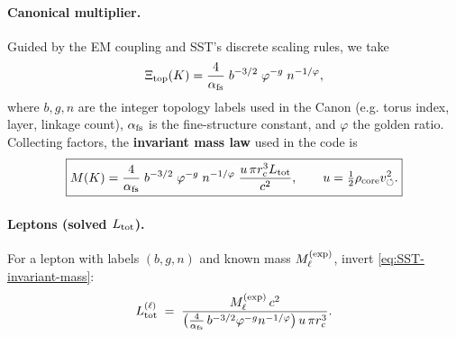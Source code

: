 \documentclass[11pt]{article}
\begin{document}
        \paragraph{Canonical multiplier.}
            Guided by the EM coupling and SST’s discrete scaling rules, we take
            \[
                \Xi_{\text{top}}(K)=\frac{4}{\alpha_{\rm fs}}\;b^{-3/2}\;\varphi^{-g}\;n^{-1/\varphi},
            \]
            where $b,g,n$ are the integer topology labels used in the Canon (e.g. torus index, layer, linkage count), $\alpha_{\rm fs}$ is the fine-structure constant, and $\varphi$ the golden ratio. Collecting factors, the \textbf{invariant mass law} used in the code is
            \begin{equation*}
                \boxed{M(K)=\frac{4}{\alpha_{\rm fs}}\;b^{-3/2}\;\varphi^{-g}\;n^{-1/\varphi}\;
                \frac{u\,\pi r_c^3 L_{\rm tot}}{c^2},
                    \qquad
                    u=\tfrac{1}{2}\rho_{\text{core}}v_{\circlearrowleft}^2.
                    }\label{eq:SST-invariant-mass}
            \end{equation*}

        \paragraph{Leptons (solved $L_{\rm tot}$).}
            For a lepton with labels $(b,g,n)$ and known mass $M_\ell^{\rm(exp)}$, invert \eqref{eq:SST-invariant-mass}:
            \[
                L_{\rm tot}^{(\ell)} \;=\;
                \frac{M_\ell^{\rm(exp)}\,c^2}{\big(\tfrac{4}{\alpha_{\rm fs}}\,b^{-3/2}\varphi^{-g}n^{-1/\varphi}\big)\,u\,\pi r_c^3}.
            \]
\end{document}
